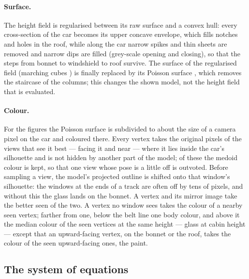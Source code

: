 \documentclass[runningheads,a4paper]{llncs}
\begin{document}
\paragraph{Surface.} The height field is regularised between its raw surface and a convex hull: every
cross-section of the car becomes its upper concave envelope, which fills notches and holes in the roof, while along
the car narrow spikes and thin sheets are removed and narrow dips are filled (grey-scale opening and closing), so that
the steps from bonnet to windshield to roof survive. The surface of the regularised field (marching cubes
\cite{marchingcubes}) is finally replaced by its Poisson surface \cite{kazhdan2006}, which removes the staircase of
the columns; this changes the shown model, not the height field that is evaluated.

\paragraph{Colour.} For the figures the Poisson
surface is subdivided to about the size of a camera pixel on the car and coloured there. Every vertex takes the
original pixels of the views that see it best --- facing it and near --- where it lies inside the car's silhouette and
is not hidden by another part of the model; of these the medoid colour is kept, so that one view whose pose is a
little off is outvoted. Before sampling a view, the model's projected outline is shifted onto that window's
silhouette: the windows at the ends of a track are often off by tens of pixels, and without this the glass lands on
the bonnet. A vertex and its mirror image take the better seen of the two. A vertex no window sees takes the colour of
a nearby seen vertex; farther from one, below the belt line one body colour, and above it the median colour of the
seen vertices at the same height --- glass at cabin height --- except that an upward-facing vertex, on the bonnet or the
roof, takes the colour of the seen upward-facing ones, the paint.

\subsection{The system of equations}\label{sec:system}
\end{document}
